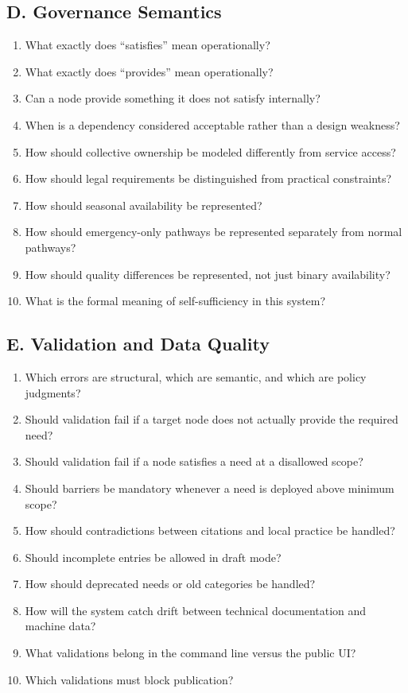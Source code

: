 \documentclass[11pt,a4paper]{article}
\begin{document}
\subsection{D. Governance Semantics}
\begin{enumerate}
    \item What exactly does ``satisfies'' mean operationally?
    \item What exactly does ``provides'' mean operationally?
    \item Can a node provide something it does not satisfy internally?
    \item When is a dependency considered acceptable rather than a design weakness?
    \item How should collective ownership be modeled differently from service access?
    \item How should legal requirements be distinguished from practical constraints?
    \item How should seasonal availability be represented?
    \item How should emergency-only pathways be represented separately from normal pathways?
    \item How should quality differences be represented, not just binary availability?
    \item What is the formal meaning of self-sufficiency in this system?
\end{enumerate}

\subsection{E. Validation and Data Quality}
\begin{enumerate}
    \item Which errors are structural, which are semantic, and which are policy judgments?
    \item Should validation fail if a target node does not actually provide the required need?
    \item Should validation fail if a node satisfies a need at a disallowed scope?
    \item Should barriers be mandatory whenever a need is deployed above minimum scope?
    \item How should contradictions between citations and local practice be handled?
    \item Should incomplete entries be allowed in draft mode?
    \item How should deprecated needs or old categories be handled?
    \item How will the system catch drift between technical documentation and machine data?
    \item What validations belong in the command line versus the public UI?
    \item Which validations must block publication?
\end{enumerate}
\end{document}
